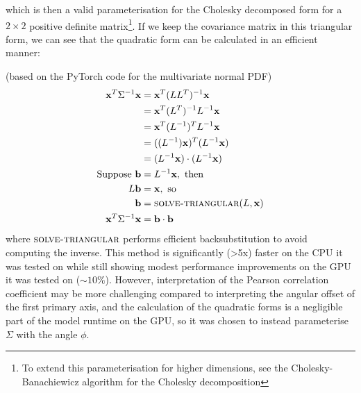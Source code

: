 \documentclass[a4paper, 12pt]{report}
\begin{document}
which is then a valid parameterisation for the Cholesky decomposed form for a $2\times 2$ positive definite matrix\footnote{To extend this parameterisation for higher dimensions, see the  Cholesky-Banachiewicz algorithm for the Cholesky decomposition}. If we keep the covariance matrix in this triangular form, we can see that the quadratic form can be calculated in an efficient manner:

(based on the PyTorch code for the multivariate normal PDF)
\begin{align}
	\mathbf{x}^T\Sigma^{-1}\mathbf{x}
	&= \mathbf{x}^T(LL^T)^{-1}\mathbf{x}\\
	&= \mathbf{x}^T(L^T)^{-1}L^{-1}\mathbf{x}\\
	&= \mathbf{x}^T(L^{-1})^{T}L^{-1}\mathbf{x}\\
	&= ((L^{-1})\mathbf{x})^T(L^{-1}\mathbf{x})\\
	&= (L^{-1}\mathbf{x})\cdot(L^{-1}\mathbf{x})\\
\textrm{Suppose }\mathbf{b}&=L^{-1}\mathbf{x}, \textrm{ then} \nonumber\\
	L\mathbf{b}&=\mathbf{x}, \textrm{ so}\nonumber\\
	\mathbf{b}&= \textsc{solve-triangular}(L, \mathbf{x})\\
	\mathbf{x}^T\Sigma^{-1}\mathbf{x} &= \mathbf{b}\cdot\mathbf{b}
\end{align}
where $\textsc{solve-triangular}$ performs efficient backsubstitution to avoid computing the inverse. This method is significantly (>5x) faster on the CPU it was tested on while still showing modest performance improvements on the GPU it was tested on ($\sim 10\%$). However, interpretation of the Pearson correlation coefficient may be more challenging compared to interpreting the angular offset of the first primary axis, and the calculation of the quadratic forms is a negligible part of the model runtime on the GPU, so it was chosen to instead parameterise $\Sigma$ with the angle $\phi$.
\end{document}
